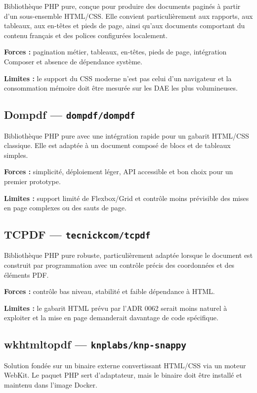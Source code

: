 \documentclass[11pt,a4paper]{article}
\begin{document}
Bibliothèque PHP pure, conçue pour produire des documents paginés à partir
d'un sous-ensemble HTML/CSS. Elle convient particulièrement aux rapports, aux
tableaux, aux en-têtes et pieds de page, ainsi qu'aux documents comportant du
contenu français et des polices configurées localement.

\textbf{Forces :} pagination métier, tableaux, en-têtes, pieds de page,
intégration Composer et absence de dépendance système.

\textbf{Limites :} le support du CSS moderne n'est pas celui d'un navigateur
et la consommation mémoire doit être mesurée sur les DAE les plus volumineuses.

\subsection{Dompdf — \texttt{dompdf/dompdf}}

Bibliothèque PHP pure avec une intégration rapide pour un gabarit HTML/CSS
classique. Elle est adaptée à un document composé de blocs et de tableaux
simples.

\textbf{Forces :} simplicité, déploiement léger, API accessible et bon choix
pour un premier prototype.

\textbf{Limites :} support limité de Flexbox/Grid et contrôle moins prévisible
des mises en page complexes ou des sauts de page.

\subsection{TCPDF — \texttt{tecnickcom/tcpdf}}

Bibliothèque PHP pure robuste, particulièrement adaptée lorsque le document
est construit par programmation avec un contrôle précis des coordonnées et des
éléments PDF.

\textbf{Forces :} contrôle bas niveau, stabilité et faible dépendance à HTML.

\textbf{Limites :} le gabarit HTML prévu par l'ADR 0062 serait moins naturel à
exploiter et la mise en page demanderait davantage de code spécifique.

\subsection{wkhtmltopdf — \texttt{knplabs/knp-snappy}}

Solution fondée sur un binaire externe convertissant HTML/CSS via un moteur
WebKit. Le paquet PHP sert d'adaptateur, mais le binaire doit être installé et
maintenu dans l'image Docker.
\end{document}
